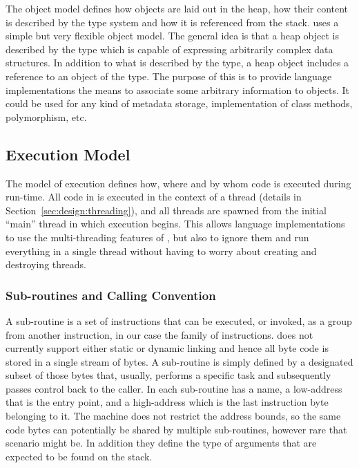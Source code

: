 The object model defines how objects are laid out in the heap, how their content
is described by the type system and how it is referenced from the
stack. \thename{} uses a simple but very flexible object model. The general idea
is that a heap object is described by the  type which is capable
of expressing arbitrarily complex data structures. In addition to what is
described by the type, a heap object includes a reference to an object of the
 type. The purpose of this is to provide language implementations
the means to associate some arbitrary information to objects. It could be used
for any kind of metadata storage, implementation of class methods, polymorphism,
etc.

\subsection{Execution Model}
\label{sec:design:exec}

The model of execution defines how, where and by whom code is executed during
run-time. All code in \thename{} is executed in the context of a thread (details
in Section~\ref{sec:design:threading}), and all threads are spawned from the
initial ``main'' thread in which execution begins. This allows language
implementations to use the multi-threading features of \thename{}, but also to
ignore them and run everything in a single thread without having to worry about
creating and destroying threads.

\subsubsection{Sub-routines and Calling Convention}
\label{sec:design:exec:sub-routine}

A sub-routine is a set of instructions that can be executed, or invoked, as a
group from another instruction, in our case the  family of
instructions. \thename{} does not currently support either static or dynamic
linking and hence all byte code is stored in a single stream of bytes. A
sub-routine is simply defined by a designated subset of those bytes that,
usually, performs a specific task and subsequently passes control back to the
caller. In \thename{} each sub-routine has a name, a low-address that is the
entry point, and a high-address which is the last instruction byte belonging to
it. The machine does not restrict the address bounds, so the same code bytes can
potentially be shared by multiple sub-routines, however rare that scenario might
be. In addition they define the type of arguments that are expected to be found
on the stack.

